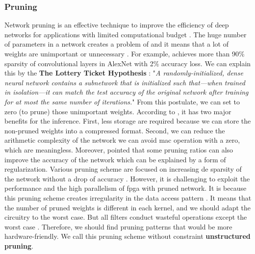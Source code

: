 \subsubsection{Pruning} \label{subs:pruning}
Network pruning is an effective technique to improve the efficiency of deep networks for applications with limited computational budget \cite{liu_rethinking_2019}. The huge number of parameters in a network creates a problem of \textcite{over-parametrization} and it means that a lot of weights are unimportant or unnecessary \cite{cheng_recent_2018}. For example, \textcite{baoyuan_liu_sparse_2015} achieves more than 90\% sparsity of convolutional layers in AlexNet with 2\% accuracy loss. We can explain this by the \textbf{The Lottery Ticket Hypothesis} \cite{frankle_lottery_2019, frankle_early_2020}: "\textit{A randomly-initialized, dense neural network contains a subnetwork that is initialized such that—when trained in isolation—it can match the test accuracy of the
original network after training for at most the same number of iterations.}" From this postulate, we can set to zero (to prune) those unimportant weights. According to \textcite{cheng_recent_2018}, it has two major benefits for the inference. First, less storage are required because we can store the non-pruned weights into a compressed format. Second, we can reduce the arithmetic complexity of the network we can avoid \acrshort{mac} operation with a zero, which are meaningless. Moreover, \textcite{han_learning_2015, mao_exploring_2017, kang_accelerator-aware_2020} pointed that some pruning ratios can also improve the accuracy of the network which can be explained by a form of regularization.\newline \newline
%
 Various pruning scheme are focused on increasing de sparsity of the network without a drop of accuracy \cite{han_learning_2015, han_deep_2016}. However, it is challenging to exploit the performance and the high parallelism of \acrshort{fpga} with pruned network. It is because this pruning scheme creates irregularity in the data access pattern \cite{zhu_efficient_2020}. It means that the number of pruned weights is different in each kernel, and we should adapt the circuitry to the worst case. But all filters conduct wasteful operations except the worst case \cite{shimoda_filter-wise_2019}. Therefore, we should find pruning patterns that would be more hardware-friendly. We call this pruning scheme without constraint \textbf{unstructured pruning}. \newline \newline
